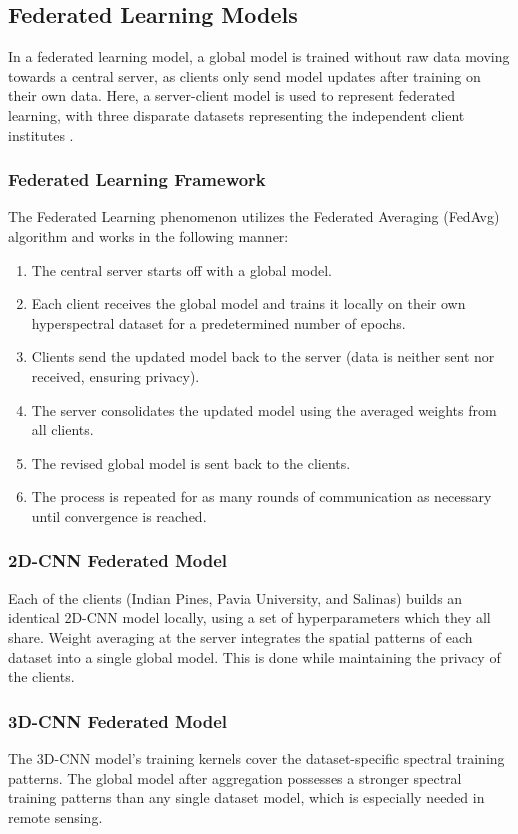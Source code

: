 \subsection{Federated Learning Models}
In a federated learning model, a global model is trained without raw data moving towards a central server, as clients only send model updates after training on their own data. Here, a server-client model is used to represent federated learning, with three disparate datasets representing the independent client institutes \cite{mcmahan2017communication}.

\subsubsection{Federated Learning Framework}
The Federated Learning phenomenon utilizes the Federated Averaging (FedAvg) algorithm and works in the following manner:
\begin{enumerate}
    \item The central server starts off with a global model.
    \item Each client receives the global model and trains it locally on their own hyperspectral dataset for a predetermined number of epochs.
    \item Clients send the updated model back to the server (data is neither sent nor received, ensuring privacy).
    \item The server consolidates the updated model using the averaged weights from all clients.
    \item The revised global model is sent back to the clients.
    \item The process is repeated for as many rounds of communication as necessary until convergence is reached.
\end{enumerate}

\subsubsection{2D-CNN Federated Model}
Each of the clients (Indian Pines, Pavia University, and Salinas) builds an identical 2D-CNN model locally, using a set of hyperparameters which they all share. Weight averaging at the server integrates the spatial patterns of each dataset into a single global model. This is done while maintaining the privacy of the clients.

\subsubsection{3D-CNN Federated Model}
The 3D-CNN model’s training kernels cover the dataset-specific spectral training patterns. The global model after aggregation possesses a stronger spectral training patterns than any single dataset model, which is especially needed in remote sensing.


